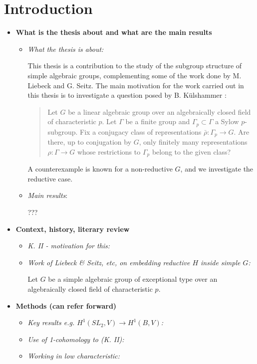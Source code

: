 
\chapter{Introduction}
\label{Chapter1}

\begin{itemize}
	\item[] \textbf{What is the thesis about and what are the main results}
	\begin{itemize}
		\item \emph{What the thesis is about:}
	
		This thesis is a contribution to the study of the subgroup structure of simple algebraic groups, complementing some of the work done by M. Liebeck and G. Seitz. The main motivation for the work carried out in this thesis is to investigate a question posed by B. K\"ulshammer \cite{weil1964remarks}:
		\begin{quote}
		Let $G$ be a linear algebraic group over an algebraically closed field of characteristic $p$. Let $\Gamma$ be a finite group and $\Gamma_p\subset\Gamma$ a Sylow $p$-subgroup. Fix a conjugacy class of representations $\bar{\rho}:\Gamma_p\rightarrow G$. Are there, up to conjugation by $G$, only finitely many representations $\rho:\Gamma\rightarrow G$ whose restrictions to $\Gamma_p$ belong to the given class?
		\end{quote}
		A counterexample is known for a non-reductive $G$, and we investigate the reductive case.

		\item \emph{Main results}:

		???
	\end{itemize}

	\item[] \textbf{Context, history, literary review}
	\begin{itemize}
		\item \emph{K. II - motivation for this:}
		\item \emph{Work of Liebeck \& Seitz, etc, on embedding reductive $H$ inside simple $G$:}
		
		Let $G$ be a simple algebraic group of exceptional type over an algebraically closed field of characteristic $p$. 
	\end{itemize}

	\item[] \textbf{Methods (can refer forward)}
	\begin{itemize}
		\item \emph{Key results e.g. $H^1(SL_2, V)\rightarrow H^1(B, V)$:}
		\item \emph{Use of 1-cohomology to (K. II):}
		\item \emph{Working in low characteristic:}
	\end{itemize}
	

\end{itemize}
